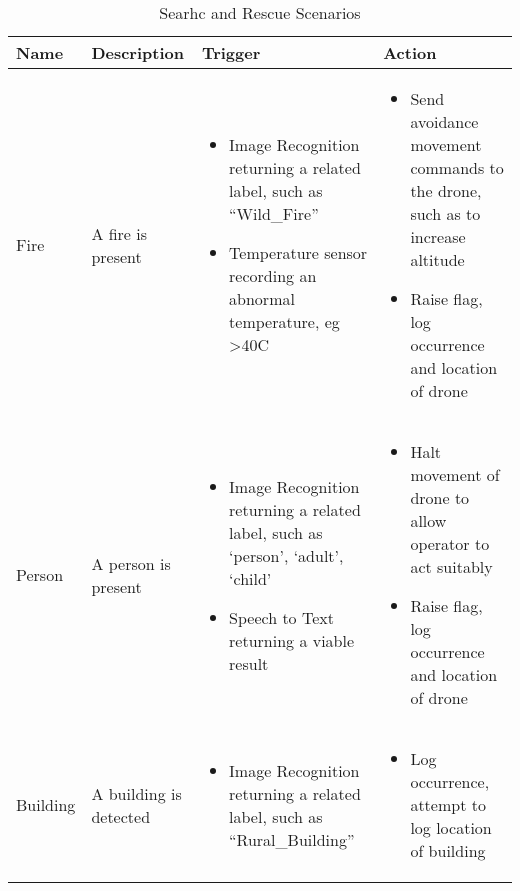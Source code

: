 \documentclass{article}
\begin{document}
\begin{table}[ht]
\caption{Searhc and Rescue Scenarios}
\hyphenchar{}
\centering
\begin{tabularx}{\textwidth}{| >{\centering}m{1.5cm} | >{\centering}m{2cm} | X | X |}
    \hline
    Name & Description & Trigger & Action \\ \hline
    Fire & \vspace{\baselineskip} A fire is present &
    \begin{itemize}[topsep=0pt, leftmargin=0cm,itemindent=.5cm,labelwidth=\itemindent,labelsep=0cm,align=left]
        \item Image Recognition returning a related label, such as “Wild\_Fire”
        \item Temperature sensor recording an abnormal temperature, eg >40C
    \end{itemize} &
    \begin{itemize} [topsep=0pt, leftmargin=0cm,itemindent=.5cm,labelwidth=\itemindent,labelsep=0cm,align=left]
        \item Send avoidance movement commands to the drone, such as to increase altitude
        \item Raise flag, log occurrence and location of drone
    \end{itemize} \\ \hline

    Person & \vspace{\baselineskip} A person is present &
    \begin{itemize} [topsep=0pt, leftmargin=0cm,itemindent=.5cm,labelwidth=\itemindent,labelsep=0cm,align=left]
        \item Image Recognition returning a related label, such as `person', `adult', `child'
        \item Speech to Text returning a viable result
    \end{itemize} &
    \begin{itemize} [topsep=0pt, leftmargin=0cm,itemindent=.5cm,labelwidth=\itemindent,labelsep=0cm,align=left]
        \item Halt movement of drone to allow operator to act suitably
        \item Raise flag, log occurrence and location of drone
    \end{itemize} \\ \hline

    Building & \vspace{\baselineskip} A building is detected &
    \begin{itemize} [topsep=0pt, leftmargin=0cm,itemindent=.5cm,labelwidth=\itemindent,labelsep=0cm,align=left]
        \item Image Recognition returning a related label, such as “Rural\_Building”
    \end{itemize} &
    \begin{itemize} [topsep=0pt, leftmargin=0cm,itemindent=.5cm,labelwidth=\itemindent,labelsep=0cm,align=left]
        \item Log occurrence, attempt to log location of building
    \end{itemize} \\ \hline


\end{tabularx}
\end{table}
\end{document}
